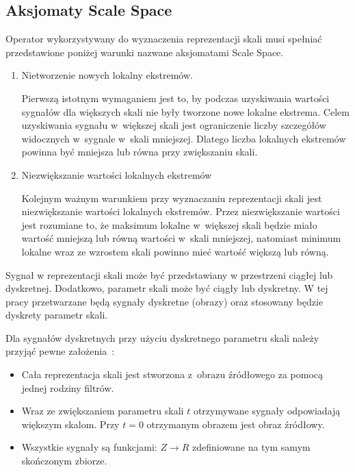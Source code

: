 \subsection{Aksjomaty Scale Space}
\label{subsec:aksjomaty}

Operator wykorzystywany do wyznaczenia reprezentacji skali musi spełniać przedstawione poniżej warunki nazwane aksjomatami Scale Space\cite{ScaleSpaceAxioms}. 

\begin{enumerate}
\item Nietworzenie nowych lokalny ekstremów.

Pierwszą istotnym wymaganiem jest to, by podczas uzyskiwania wartości sygnałów dla większych skali nie były tworzone nowe lokalne ekstrema. Celem uzyskiwania sygnału w~większej skali jest ograniczenie liczby szczegółów widocznych w~sygnale w~skali mniejszej. Dlatego liczba lokalnych ekstremów powinna być mniejsza lub równa przy zwiększaniu skali.

\item Niezwiększanie wartości lokalnych ekstremów

Kolejnym ważnym warunkiem przy wyznaczaniu reprezentacji skali jest niezwiększanie wartości lokalnych ekstremów. Przez niezwiększanie wartości jest rozumiane to, że maksimum lokalne w~większej skali będzie miało wartość mniejszą lub równą wartości w~skali mniejszej, natomiast minimum lokalne wraz ze wzrostem skali powinno mieć wartość większą lub równą.

\end{enumerate}

Sygnał w reprezentacji skali może być przedstawiany w przestrzeni ciągłej lub dyskretnej. Dodatkowo, parametr skali może być ciągły lub dyskretny. W tej pracy przetwarzane będą sygnały dyskretne (obrazy) oraz stosowany będzie dyskrety parametr skali.

Dla sygnałów dyskretnych przy użyciu dyskretnego parametru skali należy przyjąć pewne założenia~\cite{SSFDS}:
\begin{itemize}
\item Cała reprezentacja skali jest stworzona z~obrazu źródłowego za pomocą jednej rodziny filtrów.
\item Wraz ze zwiększaniem parametru skali $ t $ otrzymywane sygnały odpowiadają większym skalom. Przy $ t = 0 $ otrzymanym obrazem jest obraz źródłowy.
\item Wszystkie sygnały są funkcjami: $ Z \rightarrow R $ zdefiniowane na tym samym skończonym zbiorze.
\end{itemize}

